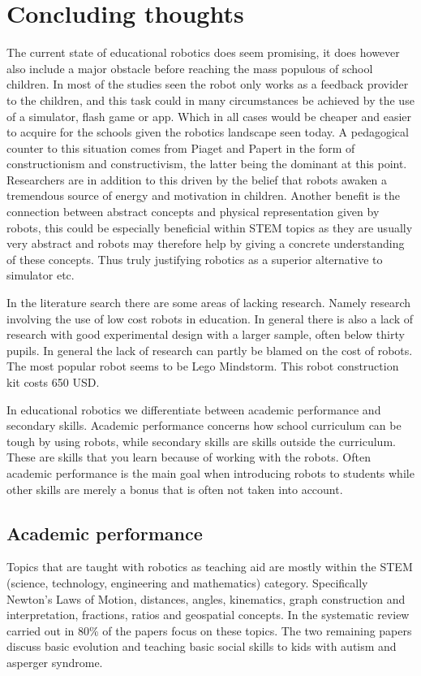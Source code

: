 \chapter{Concluding thoughts}
The current state of educational robotics does seem promising, it does however also include a major obstacle before reaching the mass populous of school children.
In most of the studies seen the robot only works as a feedback provider to the children, and this task could in many circumstances be achieved by the use of 
a simulator, flash game or app. Which in all cases would be cheaper and easier to acquire for the schools given the robotics landscape seen today.
A pedagogical counter to this situation comes from Piaget and Papert in the form of constructionism and constructivism, the latter being the dominant at this point. 
Researchers are in addition to this driven by the belief that robots awaken a tremendous source of energy and motivation in children. 
Another benefit is the connection between abstract concepts and physical representation given by robots, this could be especially beneficial within STEM topics as 
they are usually very abstract and robots may therefore help by giving a concrete understanding of these concepts. 
Thus truly justifying robotics as a superior alternative to simulator etc. 

\bigskip\noindent
In the literature search there are some areas of lacking research. Namely research involving the use of low cost robots in education. In general there is also a lack of research with good experimental design with a larger sample, often below thirty pupils. 
In general the lack of research can partly be blamed on the cost of robots. The most popular robot seems to be Lego Mindstorm. This robot construction kit costs 650 USD. 

\bigskip\noindent
In educational robotics we differentiate between academic performance and secondary skills. Academic performance concerns how school curriculum can be tough by using robots, while secondary skills are skills outside the curriculum. These are skills that you learn because of working with the robots. Often academic performance is the main goal when introducing robots to students while other skills are merely a bonus that is often not taken into account. 

\section{Academic performance}
Topics that are taught with robotics as teaching aid are mostly within the STEM (science, technology, engineering and mathematics) category. Specifically Newton's Laws of Motion, distances, angles, kinematics, graph construction and interpretation, fractions, ratios and geospatial concepts. In the systematic review carried out in \cite{Benitti2012978} 80\% of the papers focus on these topics. The two remaining papers discuss basic evolution and teaching basic social skills to kids with autism and asperger syndrome. 


